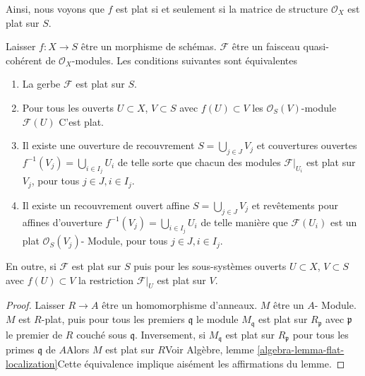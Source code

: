 \noindent
Ainsi, nous voyons que $f$ est plat si et seulement si la matrice de structure $\mathcal{O}_X$ est plat sur $S$.

\begin{lemma}

\label{lemma-flat-module-characterize}

Laisser $f : X \to S$ être un morphisme de schémas. $\mathcal{F}$ être un faisceau quasi-cohérent de $\mathcal{O}_X$-modules. Les conditions suivantes sont équivalentes

\begin{enumerate}

\item La gerbe $\mathcal{F}$ est plat sur $S$.
\item Pour tous les ouverts $U \subset X$, $V \subset S$
avec $f(U) \subset V$ les $\mathcal{O}_S(V)$-module $\mathcal{F}(U)$ C'est plat.
\item Il existe une ouverture de recouvrement $S = \bigcup_{j \in J} V_j$
et couvertures ouvertes $f^{-1}(V_j) = \bigcup_{i \in I_j} U_i$ de telle sorte que chacun des modules $\mathcal{F}|_{U_i}$ est plat sur $V_j$, pour tous $j\in J, i\in I_j$.
\item Il existe un recouvrement ouvert affine $S = \bigcup_{j \in J} V_j$
et revêtements pour affines d'ouverture $f^{-1}(V_j) = \bigcup_{i \in I_j} U_i$ de telle manière que $\mathcal{F}(U_i)$ est un plat $\mathcal{O}_S(V_j)$- Module, pour tous
$j\in J, i\in I_j$.

\end{enumerate}

En outre, si $\mathcal{F}$ est plat sur $S$ puis pour les sous-systèmes ouverts $U \subset X$, $V \subset S$ avec $f(U) \subset V$
la restriction $\mathcal{F}|_U$ est plat sur $V$.

\end{lemma}

\begin{proof}

Laisser $R \to A$ être un homomorphisme d'anneaux. $M$ être un $A$- Module. $M$ est $R$-plat, puis pour tous les premiers
$\mathfrak q$ le module $M_{\mathfrak q}$ est plat sur $R_{\mathfrak p}$
avec $\mathfrak p$ le premier de $R$ couché sous $\mathfrak q$. Inversement, si
$M_{\mathfrak q}$ est plat sur $R_{\mathfrak p}$ pour tous les primes $\mathfrak q$
de $A$Alors $M$ est plat sur $R$Voir Algèbre, lemme \ref{algebra-lemma-flat-localization}Cette équivalence implique aisément les affirmations du lemme.

\end{proof}

